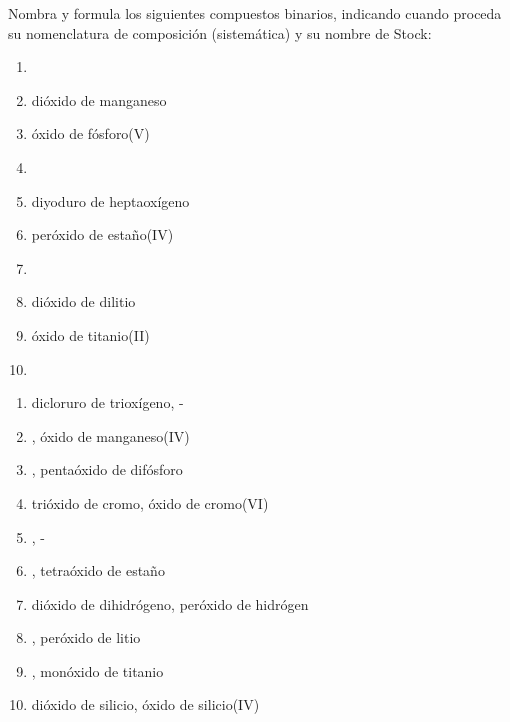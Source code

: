 \begin{exercise}[
    tags    = {inorgánica,compuestos binarios,óxidos,peróxidos},
    topics  = {química inorgánica,formulación,nomenclatura},
    source  = {SAN Formulación, p27, e32},
  ]
  Nombra y formula los siguientes compuestos binarios, indicando cuando proceda su nomenclatura de composición (sistemática) y su nombre de Stock:

  \begin{enumerate}
    \item {}
    \item dióxido de manganeso
    \item óxido de fósforo(V)
    \item {}
    \item diyoduro de heptaoxígeno
    \item peróxido de estaño(IV)
    \item {}
    \item dióxido de dilitio
    \item óxido de titanio(II)
    \item {}
  \end{enumerate}
\end{exercise}

\begin{solution}
  \begin{enumerate}
    \item dicloruro de trioxígeno, -
    \item {}, óxido de manganeso(IV)
    \item {}, pentaóxido de difósforo
    \item trióxido de cromo, óxido de cromo(VI)
    \item {}, -
    \item {}, tetraóxido de estaño
    \item dióxido de dihidrógeno, peróxido de hidrógen
    \item {}, peróxido de litio
    \item {}, monóxido de titanio
    \item dióxido de silicio, óxido de silicio(IV)
  \end{enumerate}
\end{solution}




